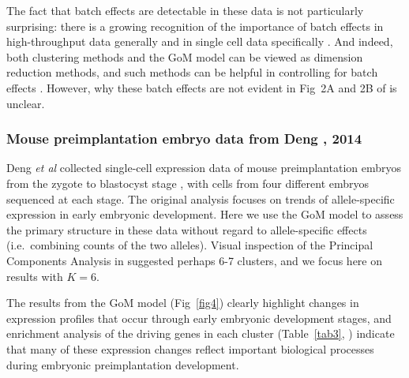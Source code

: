 \documentclass[10pt,letterpaper]{article}
\begin{document}
The fact that batch effects are detectable in these data is not particularly surprising: there is a growing recognition of the importance of batch effects in high-throughput data generally \cite{Leek2010, Danielsson2015} and in single cell data specifically \cite{Hicks2015, Gilad2015}. And indeed, both clustering methods and the GoM model can be viewed as dimension reduction methods, and such methods can be helpful in controlling for batch effects \cite{Leek2007, Stegle2012}. However, why these batch effects are not evident in Fig~2A and 2B of \cite{Jaitin2014} is unclear.


\subsubsection*{Mouse preimplantation embryo data from Deng , 2014}

Deng \textit{et al} collected single-cell expression data of mouse preimplantation embryos from the zygote to blastocyst stage \cite{Deng2014}, with cells from four different embryos sequenced at each stage. The original analysis \cite{Deng2014} focuses on trends of allele-specific expression in early embryonic development. Here we use the GoM model to assess the primary structure in these data without regard to allele-specific effects (i.e.~combining counts of the two alleles). Visual inspection of the Principal Components Analysis in \cite{Deng2014} suggested perhaps 6-7 clusters, and we focus here on results with $K=6$.

The results from the GoM model (Fig~\ref{fig4}) clearly highlight changes in expression profiles that occur through early embryonic development stages, and enrichment analysis of the driving genes in each cluster (Table~\ref{tab3},  ) indicate that many of these expression changes reflect important biological processes during embryonic preimplantation development.

%
\end{document}
